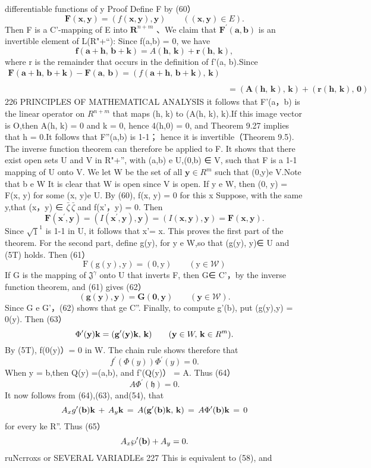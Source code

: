 differentiable functions of y Proof Define F by (60） $$ \mathbf{F}(\mathbf{x},\mathbf{y})=(f(\mathbf{x},\mathbf{y}),\mathbf{y})\qquad((\mathbf{x},\mathbf{y})\in E). $$ Then F is a C'-mapping of E into ${\boldsymbol{R}}^{n+m}$ 、We claim that $\mathbf{F}^{\prime}(\mathbf{a},\mathbf{b})$ is an invertible element of L(R"+“): Since f(a,b) = 0, we have $$ \mathbf{f}(\mathbf{a}+\mathbf{h},\,\mathbf{b}+\mathbf{k})=A(\mathbf{h},\,\mathbf{k})+\mathbf{r}(\mathbf{h},\,\mathbf{k}), $$ where r is the remainder that occurs in the definition of f'(a, b).Since $$ \begin{array}{c}{{\mathbf{F}(\mathbf{a}+\mathbf{h},\,\mathbf{b}+\mathbf{k})-\mathbf{F}(\mathbf{a},\,\mathbf{b})=(f(\mathbf{a}+\mathbf{h},\,\mathbf{b}+\mathbf{k}),\,\mathbf{k})}}\\ {{}}\\ {{}}&{{=(\mathbf{A}(\mathbf{h},\,\mathbf{k}),\,\mathbf{k})+(\mathbf{r}(\mathbf{h},\,\mathbf{k}),\,\mathbf{0})}}\end{array} $$226 PRINCIPLES OF MATHEMATICAL ANALYSIS it follows that F’(a，b) is the linear operator on $R^{n+m}$ that maps (h, k) to (A(h, k), k).If this image vector is O,then A(h, k) = 0 and k = 0, hence 4(h,0) = 0, and Theorem 9.27 implies that h = 0.It follows that F”(a,b) is 1-1； hence it is invertible（Theorem 9.5). The inverse function theorem can therefore be applied to F. It shows that there exist open sets U and V in R"+”, with (a,b) e U,(0,b) ∈ V, such that F is a 1-1 mapping of U onto V. We let W be the set of all $\mathbf{y}\in R^{m}$ such that (0,y)e V.Note that b e W It is clear that W is open since V is open. If y e W, then (0, y) = F(x, y) for some (x, y)e U. By (60), f(x, y) = 0 for this x Suppose, with the same y,that (x，y) ∈ $\bar{\zeta}\,\!\bar{\zeta}$ and f(x’，y) = 0. Then $$ \mathbf{F}(\mathbf{x}^{\prime},\mathbf{y})=(I(\mathbf{x}^{\prime},\mathbf{y}),\mathbf{y})=(I(\mathbf{x},\mathbf{y}),\mathbf{y})=\mathbf{F}(\mathbf{x},\mathbf{y}). $$ Since ${\sqrt{1}}^{1}$ is 1-1 in U, it follows that x’= x. This proves the first part of the theorem. For the second part, define g(y), for y e W,so that (g(y), y)∈ U and (5T) holds. Then (61） $$ \mathrm{{F}}(\mathrm{g}(\mathrm{y}),\mathrm{{y}})=\mathrm{(0,y)}\qquad(\mathrm{y}\in\mathcal{W}) $$ If G is the mapping of ${\mathfrak{J}}^{\gamma}$ onto U that inverts F, then G∈ C’，by the inverse function theorem, and (61) gives (62） $$ (\mathbf{g}(\mathbf{y}),\mathbf{y})=\mathbf{G}(\mathbf{0},\mathbf{y})\qquad(\mathbf{y}\in{\mathcal{W}}). $$ Since G e G'，(62) shows that ge C”. Finally, to compute g'(b), put (g(y),y) = 0(y). Then (63） $$ \Phi^{\prime}({\bf y}){\bf k}=({\bf g}^{\prime}({\bf y}){\bf k},\,{\bf k})\qquad({\bf y}\in W,\,{\bf k}\in R^{m}). $$ By (5T), f(0(y)）= 0 in W. The chain rule shows therefore that $$ f^{\prime}(\Phi(y))\Phi^{\prime}(y)=0. $$ When y = b,then Q(y) =(a,b), and f'(Q(y)） = A. Thus (64） $$ A\Phi^{\prime}({\mathfrak{h}})=0. $$ It now follows from (64),(63), and(54), that $$ A_{x}g^{\prime}({\bf b}){\bf k}\,+\,A_{y}{\bf k}\,=\,A({\bf g}^{\prime}({\bf b}){\bf k},\,{\bf k})\,=\,A\Phi^{\prime}({\bf b}){\bf k}\,=\,0 $$ for every ke R”. Thus (65） $$ A_{x}\wp^{\prime}({\bf b})+A_{y}=0. $$ruNcrroxs or SEVERAL VARIADLEs 227 This is equivalent to (58), and 